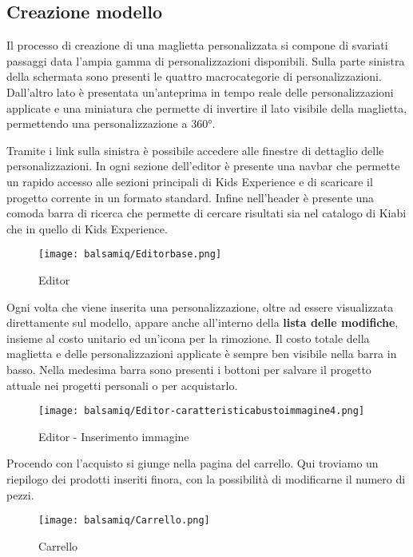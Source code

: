\documentclass[12pt,italian,]{report}
\begin{document}
\hypertarget{creazione-modello}{%
\subsection{Creazione modello}\label{creazione-modello}}

Il processo di creazione di una maglietta personalizzata si compone di
svariati passaggi data l'ampia gamma di personalizzazioni disponibili.
Sulla parte sinistra della schermata sono presenti le quattro
macrocategorie di personalizzazioni. Dall'altro lato è presentata
un'anteprima in tempo reale delle personalizzazioni applicate e una
miniatura che permette di invertire il lato visibile della maglietta,
permettendo una personalizzazione a 360°.

Tramite i link sulla sinistra è possibile accedere alle finestre di
dettaglio delle personalizzazioni. In ogni sezione dell'editor è
presente una navbar che permette un rapido accesso alle sezioni
principali di Kids Experience e di scaricare il progetto corrente in un
formato standard. Infine nell'header è presente una comoda barra di
ricerca che permette di cercare risultati sia nel catalogo di Kiabi che
in quello di Kids Experience.

\begin{figure}
\centering
\texttt{[image: balsamiq/Editorbase.png]}
\caption{Editor}
\end{figure}

Ogni volta che viene inserita una personalizzazione, oltre ad essere
visualizzata direttamente sul modello, appare anche all'interno della
\textbf{lista delle modifiche}, insieme al costo unitario ed un'icona
per la rimozione. Il costo totale della maglietta e delle
personalizzazioni applicate è sempre ben visibile nella barra in basso.
Nella medesima barra sono presenti i bottoni per salvare il progetto
attuale nei progetti personali o per acquistarlo.

\begin{figure}
\centering
\texttt{[image: balsamiq/Editor-caratteristicabustoimmagine4.png]}
\caption{Editor - Inserimento immagine}
\end{figure}

Procendo con l'acquisto si giunge nella pagina del carrello. Qui
troviamo un riepilogo dei prodotti inseriti finora, con la possibilità
di modificarne il numero di pezzi.

\begin{figure}
\centering
\texttt{[image: balsamiq/Carrello.png]}
\caption{Carrello}
\end{figure}
\end{document}
